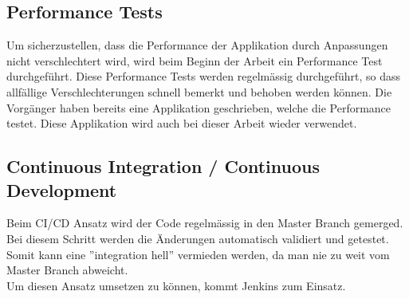 \subsection{Performance Tests}
Um sicherzustellen, dass die Performance der Applikation durch Anpassungen nicht verschlechtert wird, wird beim Beginn der Arbeit ein Performance Test durchgeführt. Diese Performance Tests werden regelmässig durchgeführt, so dass allfällige Verschlechterungen schnell bemerkt und behoben werden können. Die Vorgänger haben bereits eine Applikation geschrieben, welche die Performance testet. Diese Applikation wird auch bei dieser Arbeit wieder verwendet. 

\subsection{Continuous Integration / Continuous Development}
Beim CI/CD Ansatz wird der Code regelmässig in den Master Branch gemerged. Bei diesem Schritt werden die Änderungen automatisch validiert und getestet. Somit kann eine ''integration hell'' vermieden werden, da man nie zu weit vom Master Branch abweicht. \\
Um diesen Ansatz umsetzen zu können, kommt Jenkins zum Einsatz.
\newpage